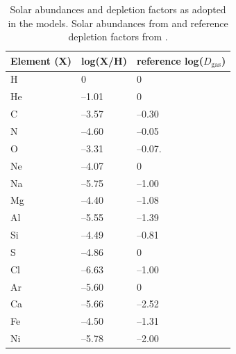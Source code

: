 \documentclass[fleqn,usenatbib]{mnras}
\begin{document}
\begin{table}
 \centering
 \caption{Solar abundances and depletion factors as adopted in the models. Solar abundances from \protect \cite{grevesse2010} and reference depletion factors from \protect \cite{dopita2013}.}
 \begin{tabularx}{\columnwidth}{p{} p{} p{} }
\hline
\hline 
\textbf{Element (X)} & \textbf{log(X/H)} & \textbf{reference log($D_{\textrm{gas}}$})             \\ \hline
H                    & 0                 & 0                                       \\
He                   & --1.01            & 0                                       \\
C                    & --3.57            & --0.30                                  \\
N                    & --4.60            & --0.05                                  \\
O                    & --3.31            & --0.07.                                 \\
Ne                   & --4.07            & 0                                       \\
Na                   & --5.75            & --1.00                                  \\
Mg                   & --4.40            & --1.08                                  \\
Al                   & --5.55            & --1.39                                  \\
Si                   & --4.49            & --0.81                                  \\
S                    & --4.86            & 0                                       \\
Cl                   & --6.63            & --1.00                                  \\
Ar                   & --5.60            & 0                                       \\
Ca                   & --5.66            & --2.52                                  \\
Fe                   & --4.50            & --1.31                                  \\
Ni                   & --5.78            & --2.00                                  \\ \hline
\end{tabularx}
\label{tab:metallicities_depletions}
\end{table}
\end{document}
